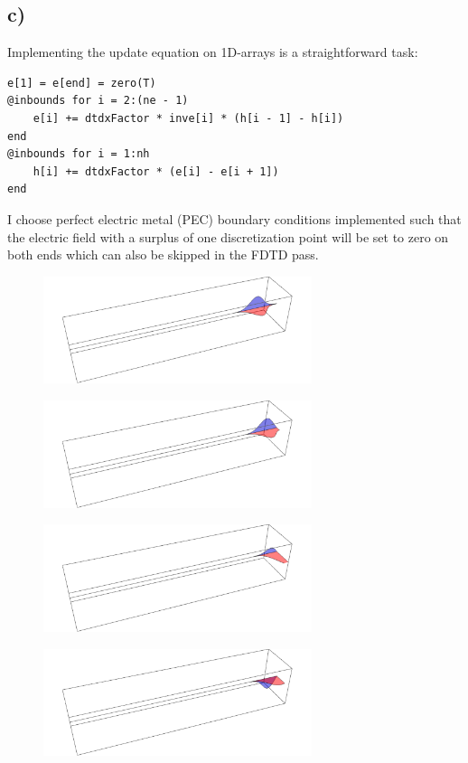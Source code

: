 \documentclass[12pt,a4paper]{article}
\begin{document}
	\subsection*{c)}
		Implementing the update equation on 1D-arrays is a straightforward task:
		\begin{lstlisting}
e[1] = e[end] = zero(T)
@inbounds for i = 2:(ne - 1)
	e[i] += dtdxFactor * inve[i] * (h[i - 1] - h[i])
end
@inbounds for i = 1:nh
	h[i] += dtdxFactor * (e[i] - e[i + 1])
end
		\end{lstlisting}
		I choose perfect electric metal (PEC) boundary conditions implemented such that the electric
		field with a surplus of one discretization point will be set to zero on both ends which
		can also be skipped in the FDTD pass.\\
		\begin{figure}[H]
			\centering
			\includegraphics[width=0.7\textwidth]{A2/data/A2b_Crash_1.png}
		\end{figure}
		\begin{figure}[H]
			\centering
			\includegraphics[width=0.7\textwidth]{A2/data/A2b_Crash_2.png}
		\end{figure}
		\begin{figure}[H]
			\centering
			\includegraphics[width=0.7\textwidth]{A2/data/A2b_Crash_3.png}
		\end{figure}
		\begin{figure}[H]
			\centering
			\includegraphics[width=0.7\textwidth]{A2/data/A2b_Crash_4.png}
		\end{figure}
\end{document}
